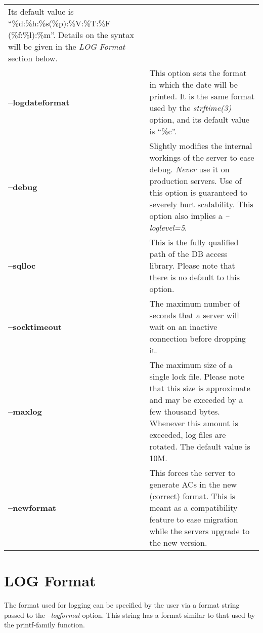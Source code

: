 \documentclass[a4paper]{book}
\begin{document}
\begin{longtable}{lp{2.9in}}
                             Its default value is ``\%d:\%h:\%s(\%p):\%V:\%T:\%F (\%f:\%l):\%m''.
			                       Details on the syntax will be given in the \emph{LOG Format}
			                       section below.\\
\textbf{--logdateformat}   & This option sets the format in which the date will be
                             printed.  It is the same format used by the
			                       \emph{strftime(3)} option, and its default value is ``\%c''.\\
\textbf{--debug}           & Slightly modifies the internal workings
                             of the server to ease debug. \emph{Never}
                             use it on production servers. Use of this
                             option is guaranteed to severely hurt
                             scalability.  This option also implies a
			                       \emph{--loglevel=5}.\\ 
\textbf{--sqlloc}          & This is the fully qualified path of the DB access library. 
                             Please note that there is no default to this option.\\
\textbf{--socktimeout}     & The maximum number of seconds that a server will wait 
                             on an inactive connection before dropping it.\\
\textbf{--maxlog}          & The maximum size of a single lock file.  Please note that
                             this size is approximate and may be exceeded by a few thousand
                             bytes.  Whenever this amount is exceeded, log files are rotated.
                             The default value is 10M.\\
\textbf{--newformat}       & This forces the server to generate ACs in the new 
                             (correct) format.  This is meant as a compatibility 
                             feature to ease migration while the servers upgrade to
                             the new version.\\
\end{longtable}

\section{LOG Format}

The format used for logging can be specified by the user via a format
string passed to the \emph{--logformat} option.  This string has a
format similar to that used by the printf-family function.
\end{document}
